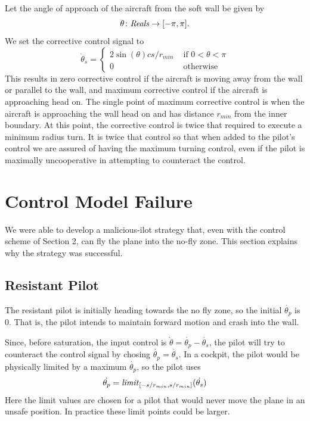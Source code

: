 \documentclass[11pt]{article}
\begin{document}
Let the angle of approach of the aircraft from the soft wall be given by
\[
\theta \colon \mbox{\textit{Reals}} \to [-\pi, \pi].
\]
We set the corrective control signal to
\[
\dot{\theta}_s = \left \{
\begin{array}{ll}
2 \sin(\theta) c s/r_{min}& \mbox{ if } 0 < \theta < \pi\\
0 & \mbox{ otherwise}
\end{array}
\right .
\]
This results in zero corrective control if the aircraft is moving
away from the wall or parallel to the wall, and maximum corrective
control if the aircraft is approaching head on.  The single point
of maximum corrective control is when the aircraft is approaching
the wall head on and has distance $r_{min}$ from the inner boundary.
At this point, the corrective control is twice that required to
execute a minimum radius turn.  It is twice that control so that
when added to the pilot's control we are assured of having
the maximum turning control, even if the pilot is maximally
uncooperative in attempting to counteract the control.

\section{Control Model Failure}

We were able to develop a malicious-ilot strategy that, even with the
control scheme of Section 2, can fly the plane into the no-fly zone.
This section explains why the strategy was successful.

\subsection{Resistant Pilot}

The resistant pilot is initially heading towards the no fly zone, so
the initial $\dot{\theta_{p}}$ is $0$.  That is, the pilot intends to
maintain forward motion and crash into the wall.

Since, before saturation, the input control is $\dot{\theta} =
\dot{\theta_{p}} - \dot{\theta_{s}}$, the pilot will try to counteract
the control signal by chosing $\dot{\theta_{p}} = \dot{\theta_{s}}$.
In a cockpit, the pilot would be physically limited by a maximum
$\dot{\theta_{p}}$, so the pilot uses
\[
\dot{\theta_{p}} = \mbox{\textit{limit}}_{[-s/r_{min},s/r_{min}]}(\dot{\theta_{s}})
\]
Here the limit values are chosen for a pilot that would never move the
plane in an unsafe position.  In practice these limit points could be
larger.
\end{document}
